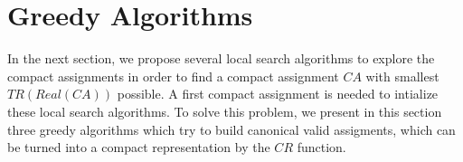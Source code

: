 





\section{Greedy Algorithms}
 
 In the next section, we propose several local search algorithms to explore the compact assignments in order to find a compact assignment $CA$ with smallest $TR(Real(CA))$ possible. A first compact assignment is needed to intialize these local search algorithms. To solve this problem, we present in this section three greedy algorithms which try to build canonical valid assigments, which can be turned into a compact representation by the $CR$ function.

